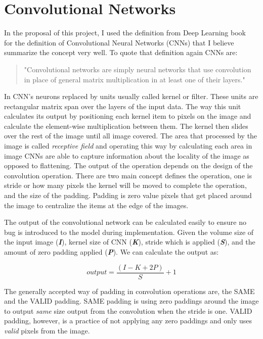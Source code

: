 \section{Convolutional Networks} \label{sec:convnets}
In the proposal of this project, I used the definition from Deep Learning book~\cite{deeplearningbook} for the definition of Convolutional Neural Networks (CNNs) that I believe summarize the concept very well. 
To quote that definition again CNNs are:
\begin{quote}
  "Convolutional networks are simply neural networks that use convolution in place of general matrix multiplication in at least one of their layers."
\end{quote}

In CNN's neurons replaced by units usually called kernel or filter.
These units are rectangular matrix span over the layers of the input data. 
The way this unit calculates its output by positioning each kernel item to pixels on the image and calculate the element-wise multiplication between them. 
The kernel then slides over the rest of the image until all image covered. 
The area that processed by the image is called \emph{receptive field} and operating this way by calculating each area in image CNNs are able to capture information about the locality of the image as opposed to flattening.
The output of the operation depends on the design of the convolution operation.
There are two main concept defines the operation, one is stride or how many pixels the kernel will be moved to complete the operation, and the size of the padding.
Padding is zero value pixels that get placed around the image to centralize the items at the edge of the images.

The output of the convolutional network can be calculated easily to ensure no bug is introduced to the model during implementation.
Given the volume size of the input image (\textbf{\textit{I}}), kernel size of CNN (\textbf{\textit{K}}), stride which is applied (\textbf{\textit{S}}), and the amount of zero padding applied (\textbf{\textit{P}}). We can calculate the output as:

\begin{equation}
  output = \frac{(I - K + 2P)}{S} + 1  
\end{equation}

The generally accepted way of padding in convolution operations are, the SAME and the VALID padding.
SAME padding is using zero paddings around the image to output \emph{same} size output from the convolution when the stride is one.
VALID padding, however, is a practice of not applying any zero paddings and only uses \emph{valid} pixels from the image.

